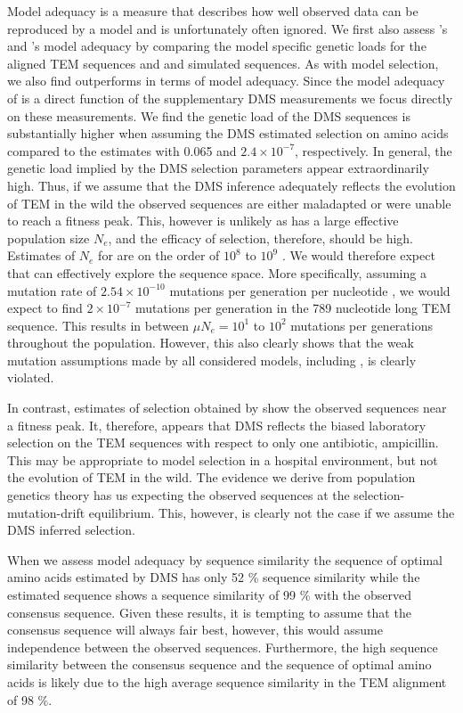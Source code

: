\documentclass[fleqn,letterpaper]{article}
\begin{document}
Model adequacy is a measure that describes how well observed data can be reproduced by a model and is unfortunately often ignored.
We first also assess \phydms's and \selac's model adequacy by comparing the model specific genetic loads for the aligned TEM sequences and and simulated sequences.
As with model selection, we also find \selac outperforms \phydms in terms of model adequacy.
Since the model adequacy of \phydms is a direct function of the supplementary DMS measurements we focus directly on these measurements.
We find the genetic load of the DMS sequences is substantially higher when assuming the DMS estimated selection on amino acids compared to the \selac estimates with 0.065 and  $2.4\times 10^{-7}$, respectively.
In general, the genetic load implied by the DMS selection parameters appear extraordinarily high.
Thus, if we assume that the DMS inference adequately reflects the evolution of TEM in the wild the observed sequences are either maladapted or were unable to reach a fitness peak.
This, however is unlikely as \ecoli has a large effective population size $N_e$, and the efficacy of selection, therefore, should be high.
Estimates of $N_e$ for \ecoli are on the order of $10^8$ to $10^9$ \citep{OchmanAndWilson1987,hartl1994}.
We would therefore expect that \ecoli can effectively explore the sequence space.
More specifically, assuming a mutation rate of $2.54\times 10^{-10}$ mutations per generation per nucleotide \citep{lee2012}, we would expect to find $2\times 10^{-7}$ mutations per generation in the 789 nucleotide long TEM sequence.
This results in between $\mu N_e = 10^1$ to $10^2$ mutations per generations throughout the population.
However, this also clearly shows that the weak mutation assumptions made by all considered models, including \selac, is clearly violated.

In contrast, estimates of selection obtained by \selac show the observed sequences near a fitness peak.
It, therefore, appears that DMS reflects the biased laboratory selection on the TEM sequences with respect to only one antibiotic, ampicillin. 
This may be appropriate to model selection in a hospital environment, but not the evolution of TEM in the wild.
The evidence we derive from population genetics theory has us expecting the observed sequences at the selection-mutation-drift equilibrium.
This, however, is clearly not the case if we assume the DMS inferred selection.

When we assess model adequacy by sequence similarity the sequence of optimal amino acids estimated by DMS has only 52 \% sequence similarity while the \selac estimated sequence shows a sequence similarity of 99 \% with the observed consensus sequence.
Given these results, it is tempting to assume that the consensus sequence will always fair best, however, this would assume independence between the observed sequences.
Furthermore, the high sequence similarity between the consensus sequence and the sequence of optimal amino acids is likely due to the high average sequence similarity in the TEM alignment of 98 \%.
\end{document}
